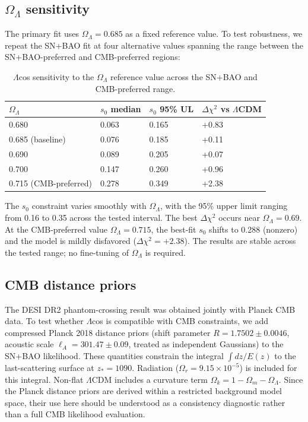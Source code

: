 \documentclass[
  aps,
  prd,
  onecolumn,         %
  nofootinbib,
  longbibliography
]{revtex4-2}
\begin{document}
\pagebreak

\subsection{$\Omega_\Lambda$ sensitivity}\label{sec:omega-sensitivity}

The primary fit uses $\Omega_\Lambda = 0.685$ as a fixed reference value. To test
robustness, we repeat the SN+BAO fit at four alternative values spanning
the range between the SN+BAO-preferred and CMB-preferred regions:

\begin{table}[!ht]
\centering\footnotesize
\caption{$\Lambda$cos sensitivity to the $\Omega_\Lambda$ reference value across the SN+BAO and CMB-preferred range.}\label{tab:omega-sensitivity}
\begin{tabular}{@{}llll@{}}
\toprule
$\Omega_\Lambda$ & $s_0$ median & $s_0$ 95\% UL & $\Delta\chi^2$ vs $\Lambda$CDM \\
\midrule

0.680 & 0.063 & 0.165 & +0.83 \\
0.685 (baseline) & 0.076 & 0.185 & +0.11 \\
0.690 & 0.089 & 0.205 & +0.07 \\
0.700 & 0.147 & 0.260 & +0.96 \\
0.715 (CMB-preferred) & 0.278 & 0.349 & +2.38 \\
\bottomrule
\end{tabular}
\end{table}

The $s_0$ constraint varies smoothly with $\Omega_\Lambda$, with the 95\% upper limit
ranging from 0.16 to 0.35 across the tested interval. The best $\Delta\chi^2$
occurs near $\Omega_\Lambda = 0.69$. At the CMB-preferred value $\Omega_\Lambda = 0.715$, the
best-fit $s_0$ shifts to 0.288 (nonzero) and the model is mildly disfavored
($\Delta\chi^2 = +2.38$). The results are stable across the tested range; no
fine-tuning of $\Omega_\Lambda$ is required.

\pagebreak

\subsection{CMB distance priors}\label{sec:cmb-priors}

The DESI DR2 phantom-crossing result was obtained jointly with Planck
CMB data. To test whether $\Lambda$cos is compatible with CMB constraints, we
add compressed Planck 2018 distance priors (shift parameter $R = 1.7502 \pm 0.0046$, acoustic scale $\ell_A = 301.47 \pm 0.09$, treated as independent
Gaussians) to the SN+BAO likelihood. These quantities constrain the
integral $\int dz/E(z)$ to the last-scattering surface at $z_* = 1090$. Radiation
($\Omega_r = 9.15 \times 10^{-5}$) is included for this integral. Non-flat $\Lambda$CDM
includes a curvature term $\Omega_k = 1 - \Omega_m - \Omega_\Lambda$. Since the Planck
distance priors are derived within a restricted background model space,
their use here should be understood as a consistency diagnostic rather
than a full CMB likelihood evaluation.
\end{document}
